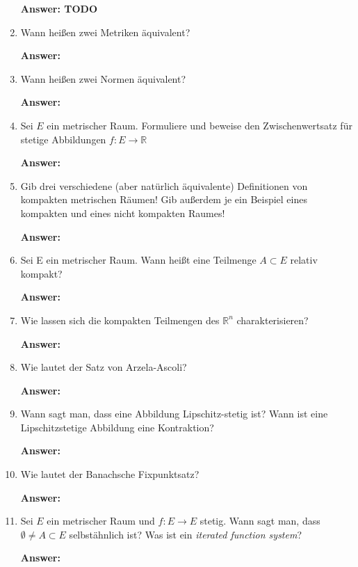 \documentclass[11pt]{article}
\newcommand{\RR}[0]{\mathbb{R}}
\begin{document}
\begin{enumerate}
    \textbf{Answer: TODO}
    \item Wann heißen zwei Metriken äquivalent?

    \textbf{Answer:}
    \item Wann heißen zwei Normen äquivalent?

    \textbf{Answer:}
    \item Sei $E$ ein metrischer Raum. Formuliere und beweise den Zwischenwertsatz für stetige Abbildungen $f\colon E \to \RR$

    \textbf{Answer:}
    \item Gib drei verschiedene (aber natürlich äquivalente) Definitionen von kompakten metrischen Räumen! Gib außerdem je ein Beispiel eines kompakten und eines nicht kompakten Raumes!

    \textbf{Answer:}
    \item Sei E ein metrischer Raum. Wann heißt eine Teilmenge $A \subset E$ relativ kompakt?

    \textbf{Answer:}
    \item Wie lassen sich die kompakten Teilmengen des $\RR^n$
    charakterisieren?

    \textbf{Answer:}
    \item Wie lautet der Satz von Arzela-Ascoli?

    \textbf{Answer:}
    \item Wann sagt man, dass eine Abbildung Lipschitz-stetig ist? Wann ist eine Lipschitzstetige Abbildung eine Kontraktion?

    \textbf{Answer:}
    \item Wie lautet der Banachsche Fixpunktsatz?

    \textbf{Answer:}
    \item Sei $E$ ein metrischer Raum und $f \colon E \to E$ stetig. Wann sagt man, dass $\emptyset \neq A \subset E$ selbstähnlich ist? Was ist ein \textit{iterated function system}?

    \textbf{Answer:}
\end{enumerate}
\end{document}
